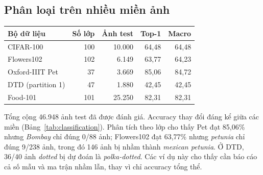 \documentclass[11pt,a4paper]{article}
\begin{document}
\subsection{Phân loại trên nhiều miền ảnh}
\begin{center}
\label{tab:classification}
\begin{tabular}{@{}lrrrr@{}}
\toprule
Bộ dữ liệu & Số lớp & Ảnh test & Top-1 & Macro \\
\midrule
CIFAR-100 & 100 & 10.000 & 64,48 & 64,48 \\
Flowers102 & 102 & 6.149 & 63,77 & 64,23 \\
Oxford-IIIT Pet & 37 & 3.669 & 85,06 & 84,72 \\
DTD (partition 1) & 47 & 1.880 & 42,45 & 42,45 \\
Food-101 & 101 & 25.250 & 82,31 & 82,31 \\
\bottomrule
\end{tabular}
\end{center}
\vspace{-5pt}
Tổng cộng 46.948 ảnh test đã được đánh giá. Accuracy thay đổi đáng kể giữa các miền (Bảng~\ref{tab:classification}). Phân tích theo lớp cho thấy Pet đạt 85,06\% nhưng \emph{Bombay} chỉ đúng 0/88 ảnh; Flowers102 đạt 63,77\% nhưng \emph{petunia} chỉ đúng 9/238 ảnh, trong đó 146 ảnh bị nhầm thành \emph{mexican petunia}. Ở DTD, 36/40 ảnh \emph{dotted} bị dự đoán là \emph{polka-dotted}. Các ví dụ này cho thấy cần báo cáo cả số mẫu và ma trận nhầm lẫn, thay vì chỉ accuracy tổng thể.
\end{document}
